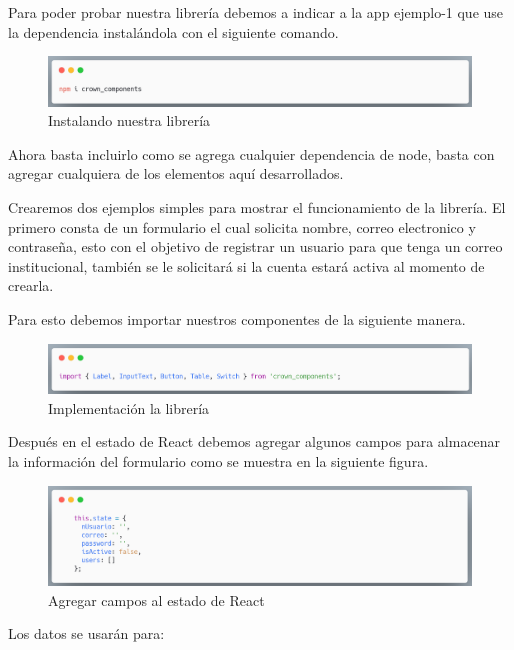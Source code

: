 Para poder probar nuestra librería debemos a indicar a la app ejemplo-1 que use la dependencia instalándola con el siguiente comando.\newline
\newline
\begin{figure}[H]
    \includegraphics[width=1\textwidth]{./Imagenes/9.4}
   \centering 
    \caption[Instalando nuestra librería]{Instalando nuestra librería}
    \end{figure}
\newline

Ahora basta incluirlo como se agrega cualquier dependencia de node, basta con agregar cualquiera de los elementos aquí desarrollados. 

Crearemos dos ejemplos simples para mostrar el funcionamiento de la librería.
El primero consta de un formulario el cual solicita nombre, correo electronico y contraseña, esto con el objetivo de registrar un usuario para que tenga un correo institucional, también se le solicitará si la cuenta estará activa al momento de crearla.

Para esto debemos importar nuestros componentes de la siguiente manera.
\newline
\begin{figure}[H]
    \includegraphics[width=1\textwidth]{./Imagenes/9.6}
   \centering 
    \caption[Implementación la librería]{Implementación la librería}
    \end{figure}
\newline

Después en el estado de React debemos agregar algunos campos para almacenar la información del formulario como se muestra en la siguiente figura.
\newline
\begin{figure}[H]
    \includegraphics[width=1\textwidth]{./Imagenes/9.7}
   \centering 
    \caption[Agregar campos al estado de React]{Agregar campos al estado de React}
    \end{figure}
\newline
Los datos se usarán para:

